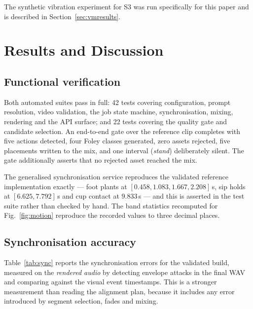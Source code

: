 \documentclass[conference]{IEEEtran}
\begin{document}
The synthetic vibration experiment for S3 was run specifically for this paper and
is described in Section~\ref{sec:vmresults}.

\section{Results and Discussion}
\label{sec:results}

\subsection{Functional verification}

Both automated suites pass in full: 42 tests covering configuration, prompt
resolution, video validation, the job state machine, synchronisation, mixing,
rendering and the API surface; and 22 tests covering the quality gate and
candidate selection. An end-to-end gate over the reference clip completes with
five actions detected, four Foley classes generated, zero assets rejected, five
placements written to the mix, and one interval (\emph{stand}) deliberately
silent. The gate additionally asserts that no rejected asset reached the mix.

The generalised synchronisation service reproduces the validated reference
implementation exactly --- foot plants at $[0.458, 1.083, 1.667, 2.208]$\,s, sip
holds at $[6.625, 7.792]$\,s and cup contact at $9.833$\,s --- and this is
asserted in the test suite rather than checked by hand. The band statistics
recomputed for Fig.~\ref{fig:motion} reproduce the recorded values to three
decimal places.

\subsection{Synchronisation accuracy}

Table~\ref{tab:sync} reports the synchronisation errors for the validated build,
measured on the \emph{rendered audio} by detecting envelope attacks in the final
WAV and comparing against the visual event timestamps. This is a stronger
measurement than reading the alignment plan, because it includes any error
introduced by segment selection, fades and mixing.
\end{document}
